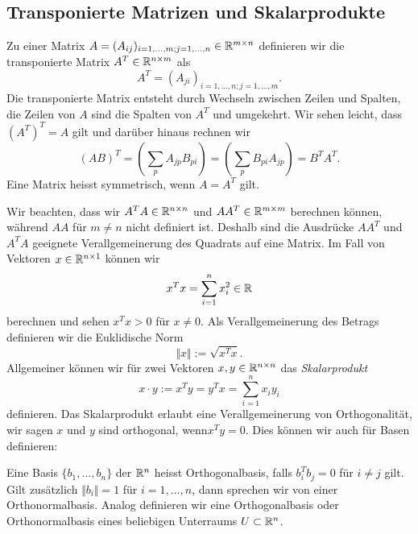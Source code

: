 \subsection{Transponierte Matrizen und Skalarprodukte}
\label{\detokenize{vektorraeume/LGS:transponierte-matrizen-und-skalarprodukte}}
Zu einer Matrix \(A=(A_{ij})_{i=1,\ldots,m;j=1,\ldots,n} \in \mathbb{R}^{m \times n}\) definieren wir die transponierte Matrix \(A^T
\in \mathbb{R}^{n \times m} \) als
\begin{equation*}
 A^T =  (A_{ji})_{i=1,\ldots,n;j=1,\ldots,m}.
\end{equation*}
Die transponierte Matrix entsteht durch Wechseln zwischen Zeilen und Spalten, die Zeilen von \(A\) sind die Spalten von \(A^T\) und umgekehrt. Wir sehen leicht, dass \((A^T)^T = A \) gilt und darüber hinaus rechnen wir
\begin{equation*}
 (AB)^T = (\sum_{p } A_{jp} B_{pi} ) = (\sum_{p } B_{pi} A_{jp}  ) = B^T A^T.
\end{equation*}
Eine Matrix heisst symmetrisch, wenn \(A=A^T\) gilt.

Wir beachten, dass wir \(A^T A \in \mathbb{R}^{n \times n}\) und \(AA^T \in \mathbb{R}^{m \times m}\) berechnen können, während \(A A \) für \(m \neq n\) nicht definiert ist. Deshalb sind die Ausdrücke \(AA^T\) und \(A^T A\)  geeignete Verallgemeinerung des Quadrats auf eine Matrix. Im Fall von Vektoren \(x \in \mathbb{R}^{n \times 1}\) können wir
\begin{equation*}
 x^T x = \sum_{i=1}^n x_i^2 \in \mathbb{R}
\end{equation*}
berechnen und sehen \(x^T x > 0\) für \(x \neq 0.\)  Als Verallgemeinerung des Betrags definieren wir die Euklidische Norm
\begin{equation*}
 \Vert x \Vert := \sqrt{x^T x}.
\end{equation*}
Allgemeiner können wir für zwei Vektoren \(x,y \in \mathbb{R}^{n \times n}\) das \emph{Skalarprodukt}
\begin{equation*}
 x \cdot y := x^T y = y^T x =  \sum_{i=1}^n x_i y_i
\end{equation*}
definieren. Das Skalarprodukt erlaubt eine Verallgemeinerung von Orthogonalität, wir sagen \(x\) und \(y\) sind orthogonal, wenn\( x^T y  = 0.\) Dies können wir auch für Basen definieren:
\label{vektorraeume/LGS:definition-4}
\begin{definition}{}{}



Eine Basis \(\{b_1,\ldots,b_n\}\) der \(\mathbb{R}^n\) heisst Orthogonalbasis, falls \(b_i^T b_j = 0\) für \(i \neq j\) gilt. Gilt zusätzlich \(\Vert b_i \Vert=1\) für \(i=1,\ldots,n\), dann sprechen wir von einer Orthonormalbasis. Analog definieren wir eine Orthogonalbasis oder Orthonormalbasis eines beliebigen Unterraums \(U \subset \mathbb{R}^n\).
\end{definition}

